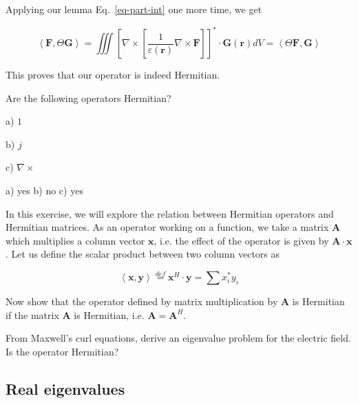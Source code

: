 Applying our lemma Eq.~\ref{eq-part-int} one more time, we get

\begin{equation}
\left\langle {\mathbf F}, \Theta {\mathbf G}\right\rangle = \iiint \left[ \nabla \times  \left [\frac{1}{\varepsilon({\mathbf r})} \nabla \times {\mathbf F}\right] \right ] ^* \cdot {\mathbf G({\mathbf r})}  dV  = \left\langle \Theta {\mathbf F}, {\mathbf G}\right\rangle 
\end{equation} 

This proves that our operator is indeed Hermitian.

\begin{exer}
Are the following operators Hermitian?

a) $1$
  
b) $j$
  
c) $\nabla \times $

\begin{sol}
a) yes b) no c) yes
\end{sol}
\end{exer}

\begin{exer}
In this exercise, we will explore the relation between Hermitian operators and Hermitian matrices. As an operator working on a function, we take a matrix ${\mathbf A}$ which multiplies a column vector ${\mathbf x}$, i.e. the effect of the operator is given by ${\mathbf A} \cdot {\mathbf x}$. Let us define the scalar product between two column vectors as

$$\left\langle {\mathbf x},{\mathbf y} \right\rangle \stackrel{def}{=} {\mathbf x}^H \cdot {\mathbf y} = \sum{x_i^* y_i}$$

Now show that the operator defined by matrix multiplication by ${\mathbf A}$ is Hermitian if the matrix ${\mathbf A}$ is Hermitian, i.e. ${\mathbf A} = {\mathbf A}^H$.
\end{exer}


\begin{exer}
From Maxwell's curl equations, derive an eigenvalue problem for the electric field. Is the operator Hermitian?
\end{exer}

\pagebreak

\label{week8}

\subsection{Real eigenvalues}

